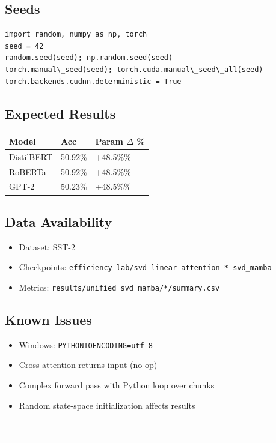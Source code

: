 \subsection{Seeds}

\begin{lstlisting}
import random, numpy as np, torch
seed = 42
random.seed(seed); np.random.seed(seed)
torch.manual\_seed(seed); torch.cuda.manual\_seed\_all(seed)
torch.backends.cudnn.deterministic = True
\end{lstlisting}

\subsection{Expected Results}

\begin{table}[H]
\centering
\small
\begin{tabular}{lll}
\toprule
\textbf{Model} & \textbf{Acc} & \textbf{Param $\Delta$ \%} \\
\midrule
DistilBERT & 50.92\% & +48.5\%\% \\
RoBERTa & 50.92\% & +48.5\%\% \\
GPT-2 & 50.23\% & +48.5\%\% \\
\bottomrule
\end{tabular}
\end{table}

\subsection{Data Availability}

\begin{itemize}
\item Dataset: SST-2
\item Checkpoints: \texttt{efficiency-lab/svd-linear-attention-*-svd\_mamba}
\item Metrics: \texttt{results/unified\_svd\_mamba/*/summary.csv}

\end{itemize}
\subsection{Known Issues}

\begin{itemize}
\item Windows: \texttt{PYTHONIOENCODING=utf-8}
\item Cross-attention returns input (no-op)
\item Complex forward pass with Python loop over chunks
\item Random state-space initialization affects results
\end{itemize}
\begin{lstlisting}

---
\end{lstlisting}

